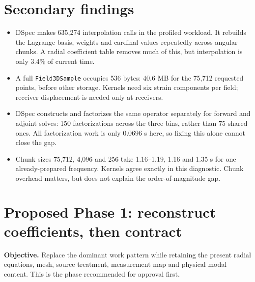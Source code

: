 \documentclass[11pt,a4paper]{article}
\begin{document}
\section{Secondary findings}
\begin{itemize}
\item DSpec makes 635,274 interpolation calls in the profiled workload. It rebuilds the Lagrange basis, weights and cardinal values repeatedly across angular chunks. A radial coefficient table removes much of this, but interpolation is only 3.4\% of current time.
\item A full \texttt{Field3DSample} occupies 536 bytes: 40.6 MB for the 75,712 requested points, before other storage. Kernels need six strain components per field; receiver displacement is needed only at receivers.
\item DSpec constructs and factorizes the same operator separately for forward and adjoint solves: 150 factorizations across the three bins, rather than 75 shared ones. All factorization work is only 0.0696 s here, so fixing this alone cannot close the gap.
\item Chunk sizes 75,712, 4,096 and 256 take 1.16--1.19, 1.16 and 1.35 s for one already-prepared frequency. Kernels agree exactly in this diagnostic. Chunk overhead matters, but does not explain the order-of-magnitude gap.
\end{itemize}
\newpage

\section{Proposed Phase 1: reconstruct coefficients, then contract}
\textbf{Objective.} Replace the dominant work pattern while retaining the present radial equations, mesh, source treatment, measurement map and physical modal content. This is the phase recommended for approval first.
\end{document}
